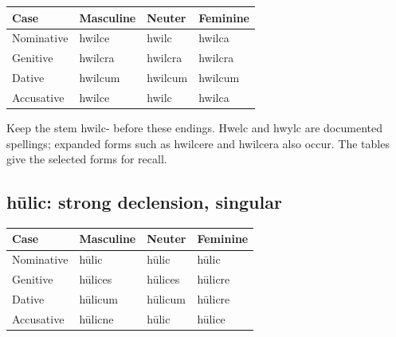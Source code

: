 \par\begingroup
\fontsize{10.5}{13.2}\selectfont
\setlength{\LTleft}{0pt}\setlength{\LTright}{\fill}
\noindent
\begin{tabular}{@{}>{\raggedright\arraybackslash}p{28.89mm}>{\raggedright\arraybackslash}p{28.89mm}>{\raggedright\arraybackslash}p{28.89mm}>{\raggedright\arraybackslash}p{28.89mm}@{}}
\toprule
\textbf{Case} & \textbf{Masculine} & \textbf{Neuter} & \textbf{Feminine} \\
\midrule
Nominative & hwilce & hwilc & hwilca \\
Genitive & hwilcra & hwilcra & hwilcra \\
Dative & hwilcum & hwilcum & hwilcum \\
Accusative & hwilce & hwilc & hwilca \\
\bottomrule
\end{tabular}
\par\endgroup

Keep the stem hwilc- before these endings. Hwelc and hwylc are documented spellings; expanded forms such as hwilcere and hwilcera also occur. The tables give the selected forms for recall.

\subsection*{hūlic: strong declension, singular}

\par\begingroup
\fontsize{10.5}{13.2}\selectfont
\setlength{\LTleft}{0pt}\setlength{\LTright}{\fill}
\noindent
\begin{tabular}{@{}>{\raggedright\arraybackslash}p{28.89mm}>{\raggedright\arraybackslash}p{28.89mm}>{\raggedright\arraybackslash}p{28.89mm}>{\raggedright\arraybackslash}p{28.89mm}@{}}
\toprule
\textbf{Case} & \textbf{Masculine} & \textbf{Neuter} & \textbf{Feminine} \\
\midrule
Nominative & hūlic & hūlic & hūlic \\
Genitive & hūlices & hūlices & hūlicre \\
Dative & hūlicum & hūlicum & hūlicre \\
Accusative & hūlicne & hūlic & hūlice \\
\bottomrule
\end{tabular}
\par\endgroup


